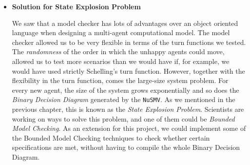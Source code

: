 \documentclass[../main.tex]{subfiles}
\begin{document}
\begin{itemize}
    \item \textbf{Solution for State Explosion Problem}
    
    We saw that a model checker has lots of advantages over an object oriented language when designing a multi-agent computational model. The model checker allowed us to be very flexible in terms of the turn functions we tested. The \textit{randomness} of the order in which the unhappy agents could move, allowed us to test more scenarios than we would have if, for example, we would have used strictly Schelling's turn function. However, together with the flexibility in the turn function, comes the large-size system problem. For every new agent, the size of the system grows exponentially and so does the \textit{Binary Decision Diagram} generated by the \verb|NuSMV|. As we mentioned in the previous chapter, this is known as the \textit{State Explosion Problem}. Scientists are working on ways to solve this problem, and one of them could be \textit{Bounded Model Checking}. As an extension for this project, we could implement some of the Bounded Model Checking techniques to check whether certain specifications are met, without having to compile the whole Binary Decision Diagram. 
    
\end{itemize}


\end{document}
